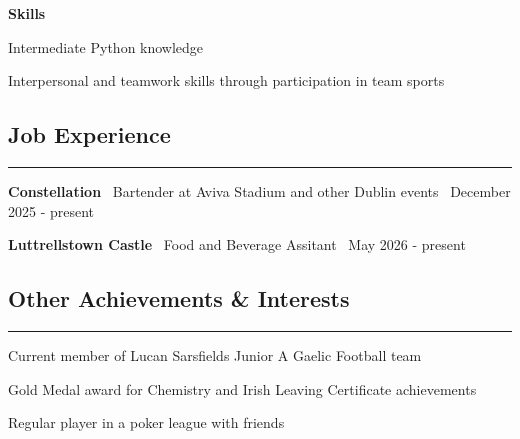 \documentclass{article}
\begin{document}
\textbf{Skills}

Intermediate Python knowledge

Interpersonal and teamwork skills through participation in team sports

\subsection*{Job Experience}
\hrule
\vspace{2mm}

\textbf{Constellation} \textbar \ Bartender at Aviva Stadium and other Dublin events \textbar \ December 2025 - present

\textbf{Luttrellstown Castle} \textbar \ Food and Beverage Assitant \textbar \ May 2026 - present


\subsection*{Other Achievements & Interests}
\hrule
\vspace{2mm}

Current member of Lucan Sarsfields Junior A Gaelic Football team

Gold Medal award for Chemistry and Irish Leaving Certificate achievements

Regular player in a poker league with friends
\end{document}
